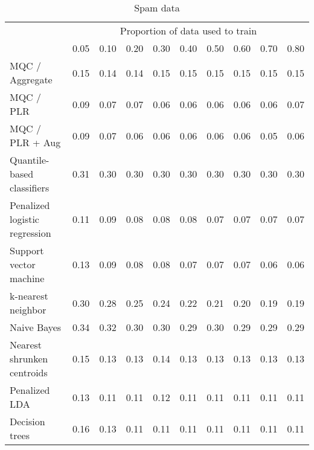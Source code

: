 \begin{table}
  \centering
  \begin{tabular}{l@{\extracolsep{2.5mm}}rrrrrrrrr}
    \toprule
    & \multicolumn{9}{c}{Proportion of data used to train} \\
    \cline{2-10}
    & 0.05 & 0.10 & 0.20 & 0.30 & 0.40 & 0.50 & 0.60 & 0.70 & 0.80 \\
    \midrule
    MQC / Aggregate & 0.15 & 0.14 & 0.14 & 0.15 & 0.15 & 0.15 & 0.15 & 0.15 & 0.15 \\ 
    MQC / PLR & 0.09 & 0.07 & 0.07 & 0.06 & 0.06 & 0.06 & 0.06 & 0.06 & 0.07 \\ 
    MQC / PLR + Aug & 0.09 & 0.07 & 0.06 & 0.06 & 0.06 & 0.06 & 0.06 & 0.05 & 0.06 \\ 
    Quantile-based classifiers & 0.31 & 0.30 & 0.30 & 0.30 & 0.30 & 0.30 & 0.30 & 0.30 & 0.30 \\ 
    Penalized logistic regression \hspace{2mm}
    & 0.11 & 0.09 & 0.08 & 0.08 & 0.08 & 0.07 & 0.07 & 0.07 & 0.07 \\ 
    Support vector machine & 0.13 & 0.09 & 0.08 & 0.08 & 0.07 & 0.07 & 0.07 & 0.06 & 0.06 \\ 
    k-nearest neighbor & 0.30 & 0.28 & 0.25 & 0.24 & 0.22 & 0.21 & 0.20 & 0.19 & 0.19 \\ 
    Naive Bayes & 0.34 & 0.32 & 0.30 & 0.30 & 0.29 & 0.30 & 0.29 & 0.29 & 0.29 \\ 
    Nearest shrunken centroids & 0.15 & 0.13 & 0.13 & 0.14 & 0.13 & 0.13 & 0.13 & 0.13 & 0.13 \\ 
    Penalized LDA & 0.13 & 0.11 & 0.11 & 0.12 & 0.11 & 0.11 & 0.11 & 0.11 & 0.11 \\ 
    Decision trees & 0.16 & 0.13 & 0.11 & 0.11 & 0.11 & 0.11 & 0.11 & 0.11 & 0.11 \\ 
    \bottomrule
  \end{tabular}

  \caption{Spam data}
  \label{tab:spam}
\end{table}





